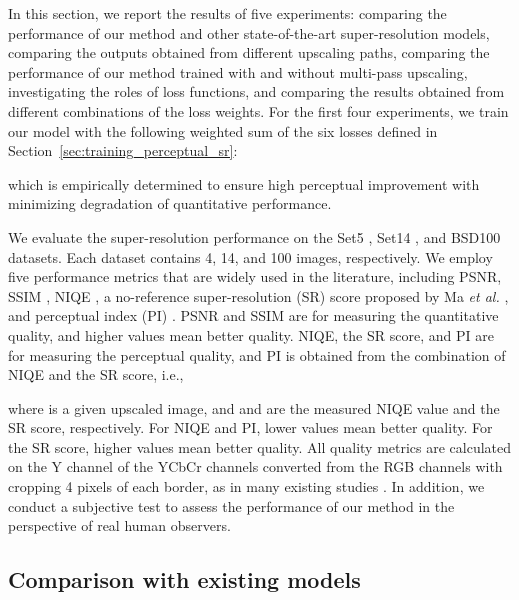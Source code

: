 \documentclass[runningheads]{llncs}
\begin{document}
In this section, we report the results of five experiments: comparing the performance of our method and other state-of-the-art super-resolution models, comparing the outputs obtained from different upscaling paths, comparing the performance of our method trained with and without multi-pass upscaling, investigating the roles of loss functions, and comparing the results obtained from different combinations of the loss weights.
For the first four experiments, we train our model with the following weighted sum of the six losses defined in Section~\ref{sec:training_perceptual_sr}:

which is empirically determined to ensure high perceptual improvement with minimizing degradation of quantitative performance.

We evaluate the super-resolution performance on the Set5 \cite{bevilacqua2012low}, Set14 \cite{zeyde2010single}, and BSD100 \cite{martin2001database} datasets.
Each dataset contains 4, 14, and 100 images, respectively.
We employ five performance metrics that are widely used in the literature, including PSNR, SSIM \cite{wang2004image}, NIQE \cite{mittal2013making}, a no-reference super-resolution (SR) score proposed by Ma \textit{et al.} \cite{ma2017learning}, and perceptual index (PI) \cite{blau20182018}.
PSNR and SSIM are for measuring the quantitative quality, and higher values mean better quality.
NIQE, the SR score, and PI are for measuring the perceptual quality, and PI is obtained from the combination of NIQE and the SR score, i.e.,

where  is a given upscaled image, and  and  are the measured NIQE value and the SR score, respectively.
For NIQE and PI, lower values mean better quality.
For the SR score, higher values mean better quality.
All quality metrics are calculated on the Y channel of the YCbCr channels converted from the RGB channels with cropping 4 pixels of each border, as in many existing studies \cite{ledig2017photo,kim2018deep,lim2017enhanced}.
In addition, we conduct a subjective test to assess the performance of our method in the perspective of real human observers.


\subsection{Comparison with existing models}
\label{sec:existing_model_comparison}
\end{document}
